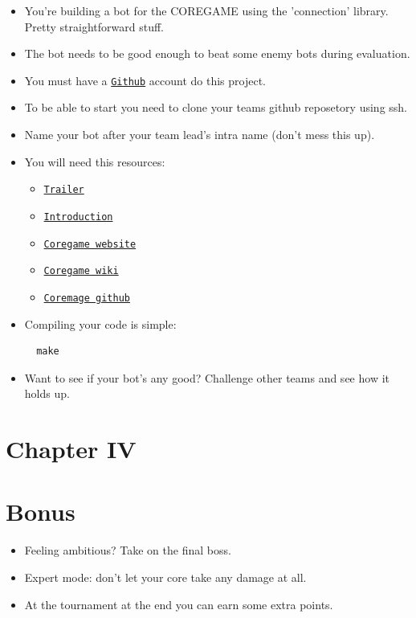 \documentclass[12pt]{article}
\begin{document}
\begin{itemize}
  \item You're building a bot for the COREGAME using the 'connection' library. Pretty straightforward stuff.
  
  \item The bot needs to be good enough to beat some enemy bots during evaluation.
  
  \item You must have a \href{https://github.com}{\texttt{Github}} account do this project.
  
  \item To be able to start you need to clone your teams github reposetory using ssh.
  
  \item Name your bot after your team lead's intra name (don't mess this up).
  
  \item You will need this resources:
  \begin{itemize}
    \item \href{https://youtu.be/gMmBgHnb8Nc?si=Thm0HOCfNIZbfCnI}{\texttt{Trailer}}
    \item \href{https://shattereddisk.github.io/rickroll/rickroll.mp4}{\texttt{Introduction}}
    \item \href{https://coregame.de}{\texttt{Coregame website}}
    \item \href{https://wiki.coregame.de}{\texttt{Coregame wiki}}
    \item \href{https://github.com/42core-team}{\texttt{Coremage github}}
  \end{itemize}
  
  \item Compiling your code is simple:
  
  \begin{verbatim}
  make
  \end{verbatim}
  
  \item Want to see if your bot's any good? Challenge other teams and see how it holds up.
\end{itemize}

\newpage

\section*{\LARGE Chapter IV}
\section*{\LARGE Bonus}

\begin{itemize}
  \item Feeling ambitious? Take on the final boss.
  \item Expert mode: don't let your core take any damage at all.
  \item At the tournament at the end you can earn some extra points.
\end{itemize}
\end{document}
